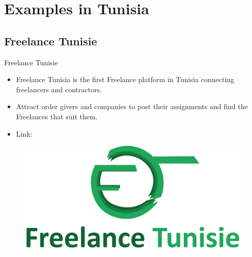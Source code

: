 \section{Examples in Tunisia}
\subsection{Freelance Tunisie}
\begin{frame}{Freelance Tunisie}
\hspace{-0.8cm}
\begin{minipage}{0.7\linewidth}
 \renewcommand{\raggedright}{\leftskip=0pt \rightskip=0pt plus 0cm}
\begin{itemize}\itemsep1em
    \item Freelance Tunisia is the first Freelance platform in Tunisia connecting freelancers and contractors.
    \item Attract order givers and companies to post their assignments and find the Freelances that suit them.
    \item Link:  \href{https://www.freelancetunisie.net/}{}
\end{itemize}
\end{minipage}
\hspace{0.4cm}
\begin{minipage}{0.2\linewidth}
\begin{figure}
    \centering
    \includegraphics[scale=0.03]{figures/freelance-tunisie.png}
\end{figure}

\end{minipage}

\end{frame}

\begin{frame}
\end{frame}


